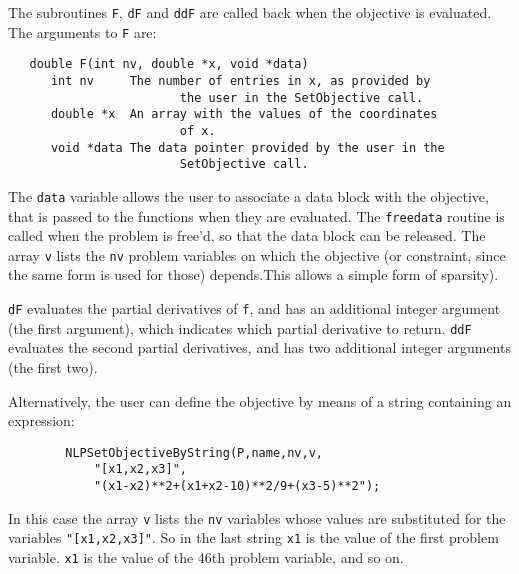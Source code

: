 \documentclass[12pt]{article}
\begin{document}
     The subroutines {\tt F}, {\tt dF} and {\tt ddF} are called back when the objective is evaluated. The
     arguments to {\tt F} are:
     \begin{verbatim}
   double F(int nv, double *x, void *data)
      int nv     The number of entries in x, as provided by
                        the user in the SetObjective call.
      double *x  An array with the values of the coordinates
                        of x.
      void *data The data pointer provided by the user in the
                        SetObjective call.
     \end{verbatim}
     The {\tt data} variable allows the user to associate a data block with the objective, that is passed to the 
     functions when they are evaluated. The {\tt freedata} routine is called when the problem is free'd, so that
     the data block can be released. The array {\tt v} lists the {\tt nv} problem variables on which the objective
     (or constraint, since the same form is used for those) depends.This allows
     a simple form of sparsity).
      
     {\tt dF} evaluates the partial derivatives of {\tt f}, and has an
     additional integer argument (the first argument), which
     indicates which partial derivative to return. {\tt ddF} evaluates the
     second partial derivatives, and has two additional integer arguments
     (the first two).

     Alternatively, the user can define the objective by means of a string containing an expression:
     \begin{verbatim}
        NLPSetObjectiveByString(P,name,nv,v,
            "[x1,x2,x3]",
            "(x1-x2)**2+(x1+x2-10)**2/9+(x3-5)**2");
     \end{verbatim}
     In this case the array {\tt v} lists the {\tt nv} variables whose values are substituted for the variables 
     {\tt "[x1,x2,x3]"}. So in the last string {\tt x1} is the value of the first problem variable. {\tt x1} is the
     value of the 46th problem variable, and so on.
\end{document}
